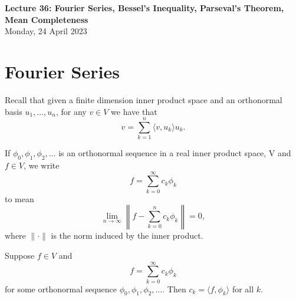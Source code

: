 \documentclass[11pt]{article}
\theoremstyle{definition}
\begin{document}
\thispagestyle{empty}

\begin{center}
{\LARGE \bf Lecture 36: Fourier Series, Bessel's Inequality, Parseval's Theorem, Mean Completeness}\\
{\large Monday, 24  April 2023}\\
\end{center}
\section{Fourier Series}
Recall that given a finite dimension inner product space and an orthonormal basis $u_1,\dots,u_n$, for any $v\in V$ we have that
$$
v=\sum_{k=1}^n \langle v,u_k\rangle u_k.
$$
\begin{mdframed}[backgroundcolor = blue!10]
\vspace{+0.1cm}
 If $\phi_0,\phi_1,\phi_2,\dots$ is an orthonormal sequence in a real inner product space, V and $f\in V$, we write
$$
f=\sum_{k=0}^\infty c_k\phi_k 
$$
to mean
$$
\lim_{n\to \infty} \left\| f -\sum_{k=0}^n c_k\phi_k \right\| =0,
$$
where $\|\cdot\|$ is the norm induced by the inner product.

\end{mdframed}
\prop Suppose $f\in V$ and
$$
f=\sum_{k=0}^\infty  c_k\phi_k
$$
for some orthonormal sequence $\phi_0,\phi_1,\phi_2,\dots$. Then $c_k = \langle f, \phi_k\rangle$ for all $k$.
\end{document}
